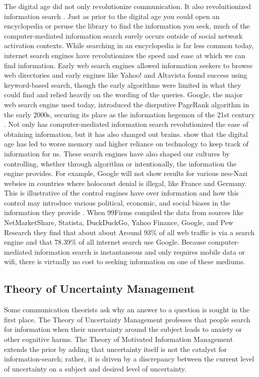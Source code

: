 The digital age did not only revolutionize communication. It also
revoluitionized information search \citep{ramirez2002information}. Just as prior
to the digital age you could open an encyclopedia or peruse the library to find
the information you seek, much of the computer-mediated information search
surely occurs outside of social network activation contexts. While searching in
an encyclopedia is far less common today, internet search engines have
revolutionizes the speed and ease at which we can find information. Early web
search engines allowed information seekers to browse web directories and early
engines like Yahoo! and Altavista found success using keyword-based search,
though the early algorithms were limited in what they could find and relied
heavily on the wording of the queries. Google, the major web search engine used
today, introduced the disrputive PageRank algorithm in the early 2000s, securing
its place as the information hegemon of the 21st century
\citep{brin1998anatomy}. Not only has computer-mediated information search
revolutionized the ease of obtaining information, but it has also changed out
brains. \citet{sparrow2011google} show that the digital age has led to worse
memory and higher reliance on technology to keep track of information for us.
These search engines have also shaped our cultures by controlling, whether
through algorithm or intentionally, the information the engine provides. For
example, Google will not show results for various neo-Nazi websies in countries
where holocaust denial is illegal, like France and Germany. This is illustrative
of the control engines have over information and how this control may introduce
various political, economic, and social biases in the information they provide
\citep{segev2010google}. When 99Firms \citeyearpar{99firms22} compiled the data
from sources like NetMarketShare, Statista, DuckDuckGo, Yahoo Finance, Google,
and Pew Research they find that about about Around 93\% of all web traffic is
via a search engine and that 78.39\% of all internet search use Google. Because
computer-mediated information search is instantaneous and only requires mobile
data or wifi, there is virtually no cost to seeking information on one of these
mediums.

\subsection{Theory of Uncertainty Management}

Some communication theorists ask why an answer to a question is sought in the
first place. The Theory of Uncertainty Management
\citep{brashersCommunicationUncertaintyManagement2001} professes that people
search for information when their uncertainty around the subject leads to
anxiety or other cognitive harms. The Theory of Motivated Information Management
\citep{afifiSeekingInformationSexual2006, afifiTheoryMotivatedInformation2004}
extends the prior by adding that uncertainty itself is not the catalyst for
information-search; rather, it is driven by a discrepancy between the current
level of uncertainty on a subject and desired level of uncertainty.




